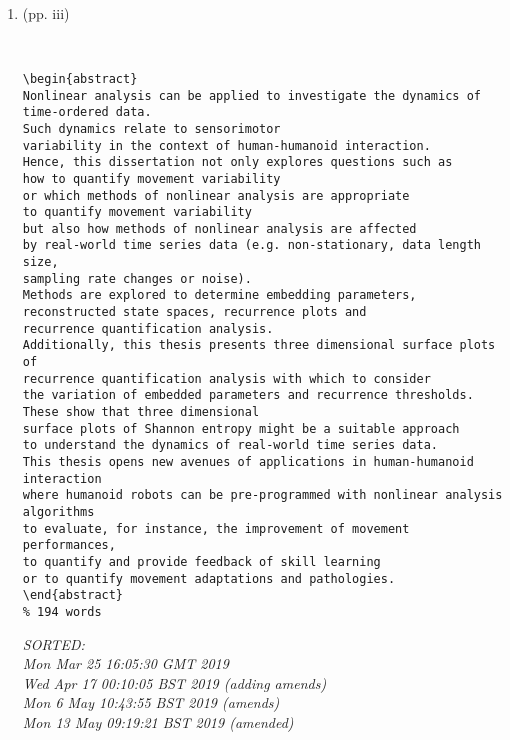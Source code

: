 \documentclass[12pt]{article}
\begin{document}
\begin{enumerate}

\item  (pp. iii)  \\ 


\begin{verbatim}


\begin{abstract}
Nonlinear analysis can be applied to investigate the dynamics of time-ordered data.
Such dynamics relate to sensorimotor 
variability in the context of human-humanoid interaction.
Hence, this dissertation not only explores questions such as 
how to quantify movement variability 
or which methods of nonlinear analysis are appropriate 
to quantify movement variability 
but also how methods of nonlinear analysis are affected 
by real-world time series data (e.g. non-stationary, data length size, 
sampling rate changes or noise).
Methods are explored to determine embedding parameters, 
reconstructed state spaces, recurrence plots and 
recurrence quantification analysis. 
Additionally, this thesis presents three dimensional surface plots of 
recurrence quantification analysis with which to consider 
the variation of embedded parameters and recurrence thresholds.
These show that three dimensional 
surface plots of Shannon entropy might be a suitable approach 
to understand the dynamics of real-world time series data. 
This thesis opens new avenues of applications in human-humanoid interaction
where humanoid robots can be pre-programmed with nonlinear analysis algorithms 
to evaluate, for instance, the improvement of movement performances,
to quantify and provide feedback of skill learning
or to quantify movement adaptations and pathologies.
\end{abstract}
% 194 words

	\end{verbatim}
	\textit{
	SORTED: \\ 
	Mon Mar 25 16:05:30 GMT 2019 \\ 
 	Wed Apr 17 00:10:05 BST 2019 (adding amends) \\
	Mon  6 May 10:43:55 BST 2019 (amends) \\
	Mon 13 May 09:19:21 BST 2019 (amended)
	}
	\\



\end{enumerate}
\end{document}
